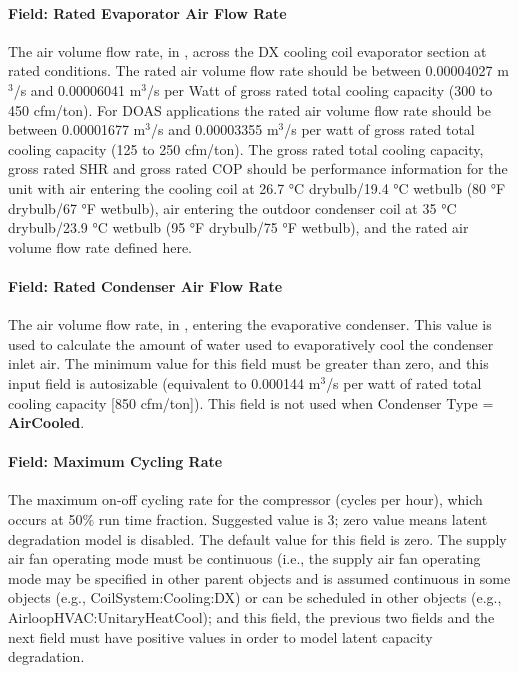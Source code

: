 \paragraph{Field: Rated Evaporator Air Flow Rate}\label{field-rated-evaporator-air-flow-rate-2}

The air volume flow rate, in \si{\volumeFlowRate}, across the DX cooling coil evaporator section at rated conditions. The rated air volume flow rate should be between 0.00004027 m\(^{3}\)/s and 0.00006041 m\(^{3}\)/s per Watt of gross rated total cooling capacity (300 to 450 cfm/ton). For DOAS applications the rated air volume flow rate should be between 0.00001677 m\(^{3}\)/s and 0.00003355 m\(^{3}\)/s per watt of gross rated total cooling capacity (125 to 250 cfm/ton). The gross rated total cooling capacity, gross rated SHR and gross rated COP should be performance information for the unit with air entering the cooling coil at 26.7 °C drybulb/19.4 °C wetbulb (80 °F drybulb/67 °F wetbulb), air entering the outdoor condenser coil at 35 °C drybulb/23.9 °C wetbulb (95 °F drybulb/75 °F wetbulb), and the rated air volume flow rate defined here.

\paragraph{Field: Rated Condenser Air Flow Rate}\label{field-rated-condenser-air-flow-rate-2}

The air volume flow rate, in \si{\volumeFlowRate}, entering the evaporative condenser. This value is used to calculate the amount of water used to evaporatively cool the condenser inlet air. The minimum value for this field must be greater than zero, and this input field is autosizable (equivalent to 0.000144 m\(^{3}\)/s per watt of rated total cooling capacity {[}850 cfm/ton{]}). This field is not used when Condenser Type = \textbf{AirCooled}.

\paragraph{Field: Maximum Cycling Rate}

The maximum on-off cycling rate for the compressor (cycles per hour), which occurs at 50\% run time fraction. Suggested value is 3; zero value means latent degradation model is disabled. The default value for this field is zero. The supply air fan operating mode must be continuous (i.e., the supply air fan operating mode may be specified in other parent objects and is assumed continuous in some objects (e.g., CoilSystem:Cooling:DX) or can be scheduled in other objects (e.g., AirloopHVAC:UnitaryHeatCool); and this field, the previous two fields and the next field must have positive values in order to model latent capacity degradation.

